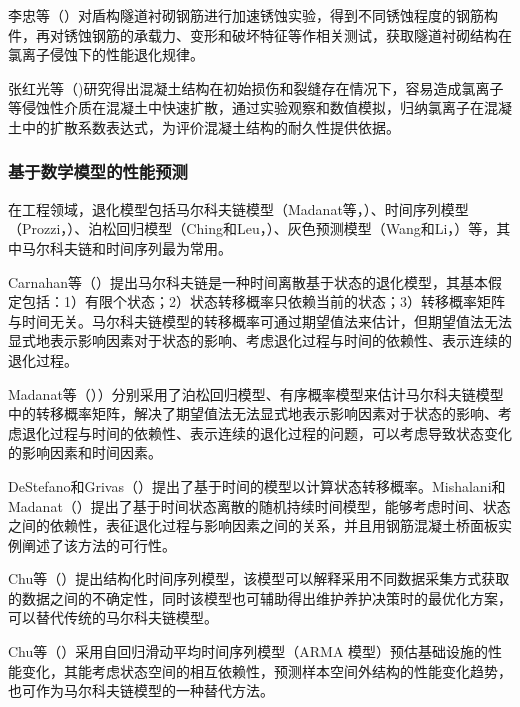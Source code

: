 李忠等（\citeyear{李忠2009氯离子侵蚀盾构隧道衬砌结构性能退化试验}）对盾构隧道衬砌钢筋进行加速锈蚀实验，得到不同锈蚀程度的钢筋构件，再对锈蚀钢筋的承载力、变形和破坏特征等作相关测试，获取隧道衬砌结构在氯离子侵蚀下的性能退化规律。

张红光等（\citeyear{张红光2014开裂混凝土内氯离子扩散机理及数值模拟研究})研究得出混凝土结构在初始损伤和裂缝存在情况下，容易造成氯离子等侵蚀性介质在混凝土中快速扩散，通过实验观察和数值模拟，归纳氯离子在混凝土中的扩散系数表达式，为评价混凝土结构的耐久性提供依据。

\subsubsection{基于数学模型的性能预测}

在工程领域，退化模型包括马尔科夫链模型（Madanat等，\citeyear{Madanat1997Probabilistic}）、时间序列模型（Prozzi，\citeyear{prozzi2001modeling}）、泊松回归模型（Ching和Leu，\citeyear{ching2009bayesian}）、灰色预测模型（Wang和Li，\citeyear{wang2011pavement}）等，其中马尔科夫链和时间序列最为常用。

Carnahan等（\citeyear{camahan1987optimal}）提出马尔科夫链是一种时间离散基于状态的退化模型，其基本假定包括：1）有限个状态；2）状态转移概率只依赖当前的状态；3）转移概率矩阵与时间无关。马尔科夫链模型的转移概率可通过期望值法来估计，但期望值法无法显式地表示影响因素对于状态的影响、考虑退化过程与时间的依赖性、表示连续的退化过程。

Madanat等（\citeyear{Madanat1997Probabilistic}））分别采用了泊松回归模型、有序概率模型来估计马尔科夫链模型中的转移概率矩阵，解决了期望值法无法显式地表示影响因素对于状态的影响、考虑退化过程与时间的依赖性、表示连续的退化过程的问题，可以考虑导致状态变化的影响因素和时间因素。

DeStefano和Grivas（\citeyear{destefano1998method}）提出了基于时间的模型以计算状态转移概率。Mishalani和Madanat（\citeyear{mishalani2002computation}）提出了基于时间状态离散的随机持续时间模型，能够考虑时间、状态之间的依赖性，表征退化过程与影响因素之间的关系，并且用钢筋混凝土桥面板实例阐述了该方法的可行性。

Chu等（\citeyear{chu2005estimation}）提出结构化时间序列模型，该模型可以解释采用不同数据采集方式获取的数据之间的不确定性，同时该模型也可辅助得出维护养护决策时的最优化方案，可以替代传统的马尔科夫链模型。

Chu等（\citeyear{chu2007estimation}）采用自回归滑动平均时间序列模型（ARMA 模型）预估基础设施的性能变化，其能考虑状态空间的相互依赖性，预测样本空间外结构的性能变化趋势，也可作为马尔科夫链模型的一种替代方法。

